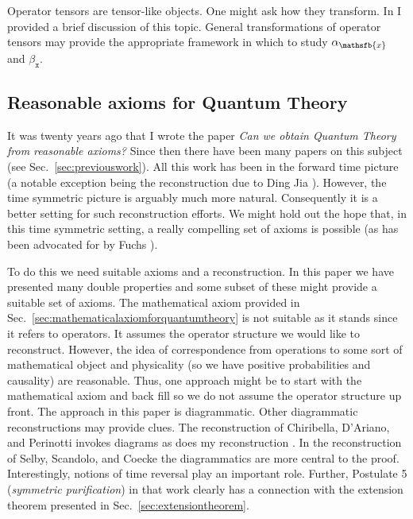 \documentclass[10pt]{article}
\begin{document}
Operator tensors are tensor-like objects. One might ask how they transform.  In \cite{hardy2012operator} I provided a brief discussion of this topic. General transformations of operator tensors may provide the appropriate framework in which to study $\alpha_\mathsfb{x}$ and $\beta_\mathtt{x}$.

\subsection{Reasonable axioms for Quantum Theory}

It was twenty years ago that I wrote the paper \emph{Can we obtain Quantum Theory from reasonable axioms?}  Since then there have been many papers on this subject (see Sec.\ \ref{sec:previouswork}).  All this work has been in the forward time picture (a notable exception being the reconstruction due to Ding Jia \cite{jia2018quantum}).  However, the time symmetric picture is arguably much more natural.  Consequently it is a better setting for such reconstruction efforts.  We might hold out the hope that, in this time symmetric setting, a really compelling set of axioms is possible (as has been advocated for by Fuchs \cite{fuchs2011some}).

To do this we need suitable axioms and a reconstruction.  In this paper we have presented many double properties and some subset of these might provide a suitable set of axioms.  The mathematical axiom provided in Sec.\ \ref{sec:mathematicalaxiomforquantumtheory} is not suitable as it stands since it refers to operators. It assumes the operator structure we would like to reconstruct.  However, the idea of correspondence from operations to some sort of mathematical object and physicality (so we have positive probabilities and causality) are reasonable.  Thus, one approach might be to start with the mathematical axiom and back fill so we do not assume the operator structure up front.  The approach in this paper is diagrammatic.  Other diagrammatic reconstructions may provide clues.  The reconstruction of Chiribella, D'Ariano, and Perinotti \cite{chiribella2010informational} invokes diagrams as does my reconstruction \cite{hardy2011reformulating}.   In the reconstruction of Selby, Scandolo, and Coecke \cite{selby2018reconstructing} the diagrammatics are more central to the proof.  Interestingly, notions of time reversal play an important role.  Further, Postulate 5 (\emph{symmetric purification}) in that work clearly has a connection with the extension theorem presented in Sec.\ \ref{sec:extensiontheorem}.
\end{document}
